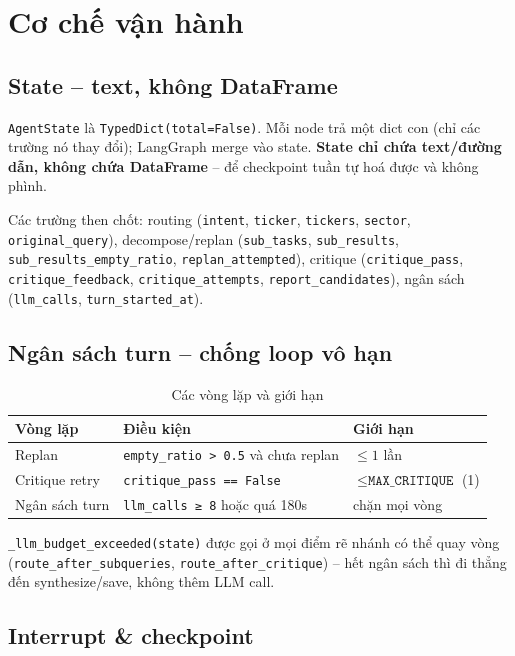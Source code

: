 \documentclass[12pt, a4paper]{report}
\begin{document}
\chapter{Cơ chế vận hành}

\section{State -- text, không DataFrame}

\texttt{AgentState} là \texttt{TypedDict(total=False)}. Mỗi node trả một dict con (chỉ các trường nó thay đổi); LangGraph merge vào state. \textbf{State chỉ chứa text/đường dẫn, không chứa DataFrame} -- để checkpoint tuần tự hoá được và không phình.

Các trường then chốt: routing (\texttt{intent}, \texttt{ticker}, \texttt{tickers}, \texttt{sector}, \texttt{original\_query}), decompose/replan (\texttt{sub\_tasks}, \texttt{sub\_results}, \texttt{sub\_results\_empty\_ratio}, \texttt{replan\_attempted}), critique (\texttt{critique\_pass}, \texttt{critique\_feedback}, \texttt{critique\_attempts}, \texttt{report\_candidates}), ngân sách (\texttt{llm\_calls}, \texttt{turn\_started\_at}).

\section{Ngân sách turn -- chống loop vô hạn}

\begin{table}[H]
\centering
\caption{Các vòng lặp và giới hạn}
\small
\begin{tabularx}{\textwidth}{lXl}
\toprule
\textbf{Vòng lặp} & \textbf{Điều kiện} & \textbf{Giới hạn} \\
\midrule
Replan & \texttt{empty\_ratio > 0.5} và chưa replan & $\leq 1$ lần \\
\rowcolor{rowgray}
Critique retry & \texttt{critique\_pass == False} & $\leq \texttt{MAX\_CRITIQUE}$ (1) \\
Ngân sách turn & \texttt{llm\_calls ≥ 8} hoặc quá 180s & chặn mọi vòng \\
\bottomrule
\end{tabularx}
\end{table}

\texttt{\_llm\_budget\_exceeded(state)} được gọi ở mọi điểm rẽ nhánh có thể quay vòng (\texttt{route\_after\_subqueries}, \texttt{route\_after\_critique}) -- hết ngân sách thì đi thẳng đến synthesize/save, không thêm LLM call.

\section{Interrupt \& checkpoint}
\end{document}
